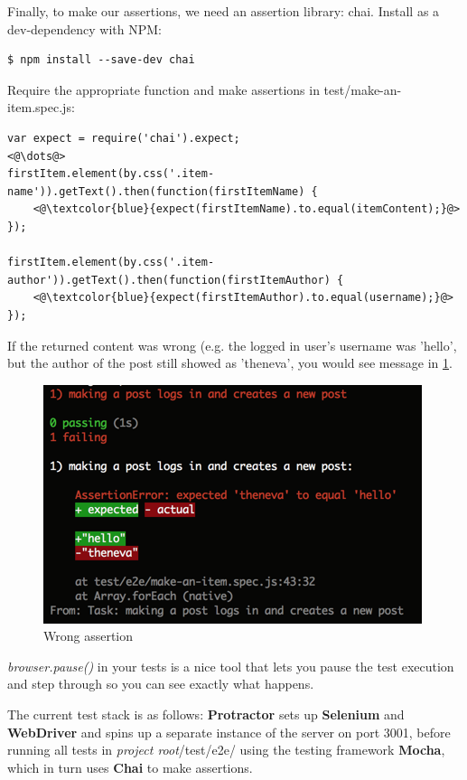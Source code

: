 \documentclass[british]{article}
\begin{document}
Finally, to make our assertions, we need an assertion library: chai. Install as a dev-dependency with NPM:

\begin{lstlisting}
$ npm install --save-dev chai
\end{lstlisting}

Require the appropriate function and make assertions in test/make-an-item.spec.js:

\begin{lstlisting}
var expect = require('chai').expect;
<@\dots@>
firstItem.element(by.css('.item-name')).getText().then(function(firstItemName) {
	<@\textcolor{blue}{expect(firstItemName).to.equal(itemContent);}@>
});

firstItem.element(by.css('.item-author')).getText().then(function(firstItemAuthor) {
	<@\textcolor{blue}{expect(firstItemAuthor).to.equal(username);}@>
});
\end{lstlisting}

If the returned content was wrong (e.g. the logged in user's username was 'hello', but the author of the post still showed as 'theneva', you would see message in \ref{fig:wrong-assertion}.

\begin{figure}[H]
    \label{fig:wrong-assertion}
    \centerline{\includegraphics[scale=0.7]{wrong-assertion}}
    \caption{Wrong assertion}
\end{figure}

\textit{browser.pause()} in your tests is a nice tool that lets you pause the test execution and step through so you can see exactly what happens.

The current test stack is as follows: \textbf{Protractor} sets up \textbf{Selenium} and \textbf{WebDriver} and spins up a separate instance of the server on port 3001,  before running all tests in \textit{project root}/test/e2e/ using the testing framework \textbf{Mocha}, which in turn uses \textbf{Chai} to make assertions.
\end{document}
